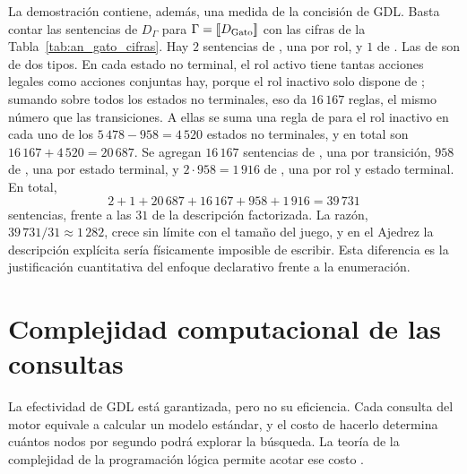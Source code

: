 La demostración contiene, además, una medida de la concisión de GDL. Basta contar las sentencias de $D_\Gamma$ para $\Gamma = [\![D_{\text{Gato}}]\!]$ con las cifras de la Tabla~\ref{tab:an_gato_cifras}. Hay $2$ sentencias de , una por rol, y $1$ de . Las de  son de dos tipos. En cada estado no terminal, el rol activo tiene tantas acciones legales como acciones conjuntas hay, porque el rol inactivo solo dispone de ; sumando sobre todos los estados no terminales, eso da $16\,167$ reglas, el mismo número que las transiciones. A ellas se suma una regla de  para el rol inactivo en cada uno de los $5\,478 - 958 = 4\,520$ estados no terminales, y en total son $16\,167 + 4\,520 = 20\,687$. Se agregan $16\,167$ sentencias de , una por transición, $958$ de , una por estado terminal, y $2 \cdot 958 = 1\,916$ de , una por rol y estado terminal. En total,
\begin{equation*}
    2 + 1 + 20\,687 + 16\,167 + 958 + 1\,916 = 39\,731
\end{equation*}
sentencias, frente a las $31$ de la descripción factorizada. La razón, $39\,731 / 31 \approx 1\,282$, crece sin límite con el tamaño del juego, y en el Ajedrez la descripción explícita sería físicamente imposible de escribir. Esta diferencia es la justificación cuantitativa del enfoque declarativo frente a la enumeración.

\section{Complejidad computacional de las consultas}
\label{sec:an_costo}

La efectividad de GDL está garantizada, pero no su eficiencia. Cada consulta del motor equivale a calcular un modelo estándar, y el costo de hacerlo determina cuántos nodos por segundo podrá explorar la búsqueda. La teoría de la complejidad de la programación lógica permite acotar ese costo \cite{Dantsin2001Complexity}.

